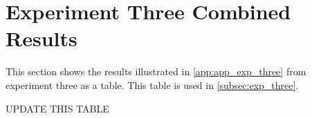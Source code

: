 \section{Experiment Three Combined Results}\label{app:exp-3-table-res}

This section shows the results illustrated in \cref{app:app_exp_three} from experiment three as a table. This table is used in \cref{subsec:exp_three}.

UPDATE THIS TABLE


